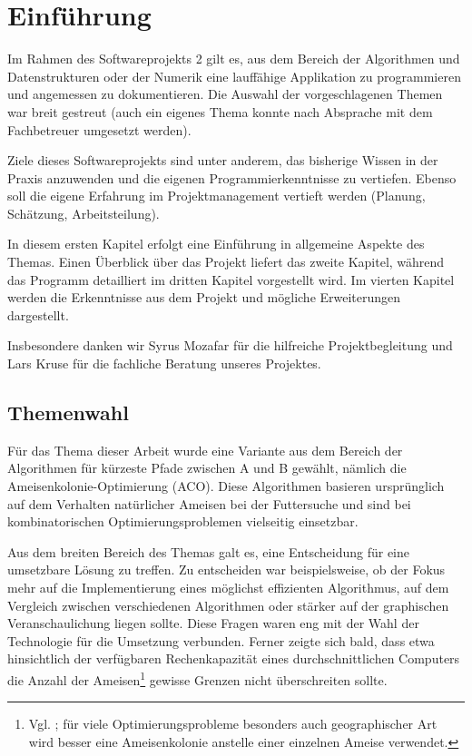 

\chapter{Einführung}

Im Rahmen des Softwareprojekts 2 gilt es, aus dem Bereich der Algorithmen und
Datenstrukturen oder der Numerik eine lauffähige Applikation zu programmieren
und angemessen zu dokumentieren. Die Auswahl der vorgeschlagenen Themen war
breit gestreut (auch ein eigenes Thema konnte nach Absprache mit dem
Fachbetreuer umgesetzt werden).

Ziele dieses Softwareprojekts sind unter anderem, das bisherige Wissen in der
Praxis anzuwenden und die eigenen Programmierkenntnisse zu vertiefen. Ebenso
soll die eigene Erfahrung im Projektmanagement vertieft werden (Planung, 
Schätzung, Arbeitsteilung).

In diesem ersten Kapitel erfolgt eine Einführung in allgemeine Aspekte des
Themas. Einen Überblick über das Projekt liefert das zweite Kapitel, während das
Programm detailliert im dritten Kapitel vorgestellt wird. Im vierten Kapitel
werden die Erkenntnisse aus dem Projekt und mögliche Erweiterungen dargestellt.

Insbesondere danken wir Syrus Mozafar für die hilfreiche
Projektbegleitung und Lars Kruse für die fachliche Beratung unseres Projektes.




\section{Themenwahl}

Für das Thema dieser Arbeit wurde eine Variante aus dem Bereich der Algorithmen
für kürzeste Pfade zwischen A und B gewählt, nämlich die
Ameisenkolonie-Optimierung (ACO). Diese Algorithmen basieren ursprünglich auf
dem Verhalten natürlicher Ameisen bei der Futtersuche und sind bei
kombinatorischen Optimierungsproblemen vielseitig einsetzbar.

Aus dem breiten Bereich des Themas galt es, eine Entscheidung für eine
umsetzbare Lösung zu treffen. Zu entscheiden war beispielsweise, ob der Fokus
mehr auf die Implementierung eines möglichst effizienten Algorithmus, auf dem
Vergleich zwischen verschiedenen Algorithmen oder stärker auf der graphischen
Veranschaulichung liegen sollte. Diese Fragen waren eng mit der Wahl der
Technologie für die Umsetzung verbunden. Ferner zeigte sich bald, dass
etwa hinsichtlich der verfügbaren Rechenkapazität eines durchschnittlichen
Computers die Anzahl der Ameisen\footnote{Vgl. \citet*[S. 217]{ds-ant}; für
viele Optimierungsprobleme besonders auch geographischer Art wird besser eine
Ameisenkolonie anstelle einer einzelnen Ameise verwendet.} gewisse
Grenzen nicht überschreiten sollte.

